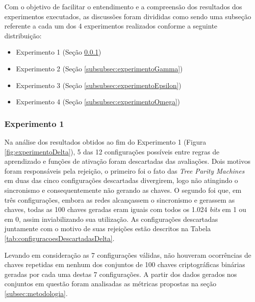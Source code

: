 \documentclass[12pt]{article}
\newcommand{\bits}{\textit{bits}\xspace}
\begin{document}
            Com o objetivo de facilitar o entendimento e a compreensão dos resultados dos experimentos executados, as discussões foram divididas como sendo uma subseção referente a cada um dos 4 experimentos realizados conforme a seguinte distribuição:

            \begin{itemize}
                \item Experimento 1 (Seção \ref{subsubsec:experimentoDelta})
                \item Experimento 2 (Seção \ref{subsubsec:experimentoGamma})
                \item Experimento 3 (Seção \ref{subsubsec:experimentoEpsilon})
                \item Experimento 4 (Seção \ref{subsubsec:experimentoOmega})
            \end{itemize}

            \subsubsection{Experimento 1}
            \label{subsubsec:experimentoDelta}

                Na análise dos resultados obtidos ao fim do Experimento 1 (Figura \ref{fig:experimentoDelta}), 5 das 12 configurações possíveis entre regras de aprendizado e funções de ativação foram descartadas das avaliações. Dois motivos foram responsáveis pela rejeição, o primeiro foi o fato das \textit{Tree Parity Machines} em duas das cinco configurações descartadas divergirem, logo não atingindo o sincronismo e consequentemente não gerando as chaves. O segundo foi que, em três configurações, embora as redes alcançassem o sincronismo e gerassem as chaves, todas as 100 chaves geradas eram iguais com todos os 1.024 \bits em 1 ou em 0, assim inviabilizando sua utilização. As configurações descartadas juntamente com o motivo de suas rejeições estão descritos na Tabela \ref{tab:configuracoesDescartadasDelta}.

                
            
                Levando em consideração as 7 configurações válidas, não houveram ocorrências de chaves repetidas em nenhum dos conjuntos de 100 chaves criptográficas binárias geradas por cada uma destas 7 configurações. A partir dos dados gerados nos conjuntos em questão foram analisadas as métricas propostas na seção \ref{subsec:metodologia}.
                
\end{document}
